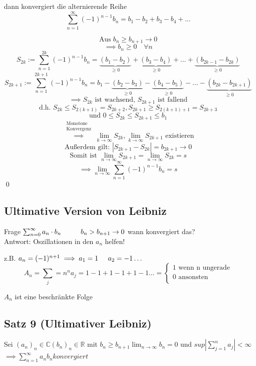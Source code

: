\documentclass[fleqn]{scrbook}
\newcommand{\R}{\mathbb{R}}
\newcommand{\sumOI}{\sum_{n=1}^{\infty}}
\renewenvironment{proof}{{\bfseries Beweis }}{\qed}
\begin{document}
dann konvergiert die alternierende Reihe
\[\sumOI (-1)^{n-1} b_n = b_1-b_2+b_3-b_4+\ldots \]

\begin{proof}
 \[\text{Aus } b_n \geq b_{n+1} \to 0\]
 \[\implies b_n \geq 0 \quad \forall n\]
 \[S_{2k}:=\sum_{n=1}^{2k} (-1)^{n-1} b_n = \underbrace{(b_1-b_2)}_{\geq 0}+\underbrace{(b_3-b_4)}_{\geq 0}+\ldots+\underbrace{(b_{2k-1}-b_{2k})}_{\geq 0}\]
 \[S_{2k+1}:=\sum_{n=1}^{2k+1} (-1)^{n-1} b_n = b_1 - \underbrace{(b_2-b_3)}_{\geq 0}-\underbrace{(b_4-b_5)}_{\geq 0}-\ldots-\underbrace{(b_{2k}-b_{2k+1})}_{\geq 0}\]
 \[\implies S_{2k} \text{ ist wachsend, } S_{2k+1} \text{ ist fallend}\]
 \[\text{d.h. } S_{2k} \leq S_{2(k+1)} = S_{2k+2}, S_{2k+1} \geq S_{2(k+1)+1} = S_{2k+3}\]
 \[\text{und } 0\leq S_{2k} \leq S_{2k+1} \leq b_1\]
 \[\stackrel{\begin{array}{l}\text{Monotone}\\\text{Konvergenz}\end{array}}{\implies} \lim_{k \to \infty} S_{2k}, \lim_{k \to \infty} S_{2k+1} \text{ existieren} \]
 \[\text{Außerdem gilt: } |S_{2k+1}-S_{2k}|=b_{2k+1} \to 0\]
 \[\text{Somit ist } \lim_{n\to \infty} S_{2k+1} = \lim_{n\to \infty} S_{2k} = s\]
 \[\implies \lim_{n \to \infty} \sumOI (-1)^{n-1} b_n=s\] 
\end{proof}

\subsection{Ultimative Version von Leibniz}
Frage $\sum_{n=0}^{\infty} a_n \cdot b_n \hspace{10mm} b_n > b_{n+1} \to 0$ wann konvergiert das? \\
Antwort: Oszillationen in den $a_n$ helfen!

z.B. $a_n = (-1)^{n+1} \implies a_1 = 1 \hspace{5mm} a_2 = -1 \ldots $
$$A_n = \sum_j=n^{n} a_j = 1-1+1-1+1-1 \ldots =  
\begin{cases}
\text{1 wenn n ungerade}	\\
\text{0 ansonsten }		\\
\end{cases}
$$

$A_n$ ist eine beschränkte Folge

\subsection{Satz 9 (Ultimativer Leibniz)}
Sei $(a_n)_n \in \mathbb{C} (b_n)_n \in \R$ mit $b_n \geq b_{n+1} \lim_{n \to \infty} b_{n} = 0 $ und $sup | \sum_{j=1}^{n} a_j| < \infty$
$\implies  \sumOI a_n b_n konvergiert$
\end{document}
